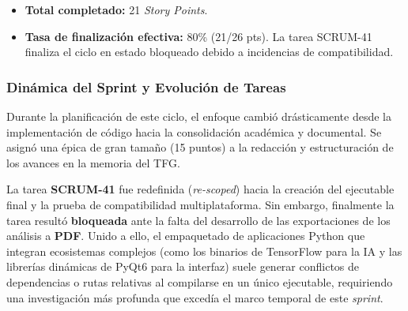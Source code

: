 \begin{table}[H]
    \centering
    \caption{Catálogo de tareas del Sprint 8.}
\end{table}

\begin{itemize}
    \item \textbf{Total completado:} 21 \textit{Story Points}.
    \item \textbf{Tasa de finalización efectiva:} 80\% (21/26 pts). La tarea SCRUM-41 finaliza el ciclo en estado bloqueado debido a incidencias de compatibilidad.
\end{itemize}

\subsubsection{Dinámica del Sprint y Evolución de Tareas}
Durante la planificación de este ciclo, el enfoque cambió drásticamente desde la implementación de código hacia la consolidación académica y documental. Se asignó una épica de gran tamaño (15 puntos) a la redacción y estructuración de los avances en la memoria del TFG. 

La tarea \textbf{SCRUM-41} fue redefinida (\textit{re-scoped}) hacia la creación del ejecutable final y la prueba de compatibilidad multiplataforma. Sin embargo, finalmente la tarea resultó \textbf{bloqueada} ante la falta del desarrollo de las exportaciones de los análisis a \textbf{PDF}. Unido a ello, el empaquetado de aplicaciones Python que integran ecosistemas complejos (como los binarios de TensorFlow para la IA y las librerías dinámicas de PyQt6 para la interfaz) suele generar conflictos de dependencias o rutas relativas al compilarse en un único ejecutable, requiriendo una investigación más profunda que excedía el marco temporal de este \textit{sprint}.

